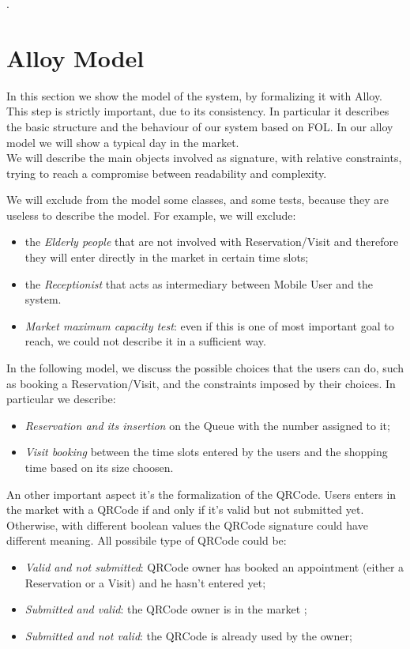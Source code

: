 \lstset{language=Alloy}.



\section{Alloy Model}
In this section we show the model of the system, by formalizing it with Alloy. This step is strictly important, due to its consistency. 
In particular it describes the basic structure and the behaviour of our system based on FOL.
In our alloy model we will show a typical day in the market. \\
We will describe the main objects involved as signature, with relative constraints, trying to reach a compromise between readability and complexity.
\par
We will exclude from the model some classes, and some tests, because they are useless to describe the model.
For example, we will exclude:
\begin{itemize}
\item the \textit{Elderly people} that are not involved with Reservation/Visit and therefore they will enter directly in the market in certain time slots;
\item the \textit{Receptionist} that acts as intermediary between Mobile User and the system. 
\item \textit{Market maximum capacity test}: even if this is one of most important goal to reach, we could not describe it in a sufficient way.
\end{itemize}
\pagebreak
In the following model, we discuss the possible choices that the users can do, such as booking a Reservation/Visit, and the constraints imposed by their choices.
In particular we describe:
\begin{itemize}
\item \textit{Reservation and its insertion} on the Queue with the number assigned to it;
\item \textit{Visit booking} between the time slots entered by the users and the shopping time based on its size choosen.
\end{itemize}
\par
An other important aspect it's the formalization of the QRCode. Users enters in the market with a QRCode if and only if it's valid but not submitted yet. Otherwise, with different boolean values the QRCode signature could have different meaning. All possibile type of QRCode could be:
\begin{itemize}
    \item \textit{Valid and not submitted}: QRCode owner has booked an appointment (either a Reservation or a Visit) and he hasn't entered yet;
    \item \textit{Submitted and valid}: the QRCode owner is in the market ;
    \item \textit{Submitted and not valid}: the QRCode is already used by the owner;
\end{itemize}


